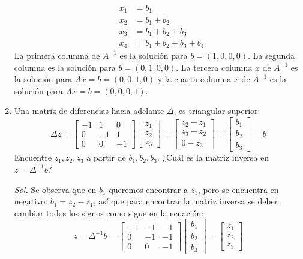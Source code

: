 \begin{enumerate}
	      \begin{align*}
		       & x_1& =b_1                   \\
		       & x_2& =b_{1}+b_2             \\
		       & x_3 & =b_{1}+b_2 +b_3        \\
		       & x_{4} & =b_{1}+b_2 +b_{3}+b_{4 }
	      \end{align*}
	      La primera columna de $A^{-1}$ es la solución para $b = (1,0,0,0)$. La segunda columna es la solución
	      para $b = (0,1,0,0)$. La tercera columna $x$ de $A^{-1}$ es la solución para $Ax = b = (0,0,1,0)$ y la cuarta columna $x$ de $A^{-1}$ es la solución para $Ax = b = (0,0,0,1)$.
	\item Una matriz de diferencias hacia adelante $\Delta$, es triangular superior:
	      \begin{equation*}
		      \Delta z= \begin{bmatrix} -1 & 1 &0 \\ 0 & -1 &1\\ 0 & 0 & -1 \end{bmatrix}\begin{bmatrix} z_{1}\\ z_2 \\ z_3 \end{bmatrix} = \begin{bmatrix} z_2 -z_{1}\\ z_{3}-z_2 \\ 0-z_3 \end{bmatrix} =\begin{bmatrix}
			      b_1\\b_2 \\b_{3}
		      \end{bmatrix}=b
	      \end{equation*}
	      Encuentre $z_{1}, z_2 , z_{3}$ a partir de $ b_{1},b_2 ,b_{3}$. ¿Cuál es la matriz inversa en $z= \Delta^{-1}b$?

	      \textit{ Sol. }
	      Se observa que en $b_{1}$ queremos encontrar a $z_{1}$, pero se encuentra en negativo: $b_{1}= z_2 -z_{1}$, así que para encontrar la matriz inversa se deben cambiar todos los signos como sigue en la ecuación:
	      \begin{equation}
		      z= \Delta^{-1}b= \begin{bmatrix} -1 & -1 &-1 \\ 0 & -1 &-1\\ 0 & 0 & -1 \end{bmatrix} \begin{bmatrix}
			      b_1\\b_2 \\b_{3}
		      \end{bmatrix} =\begin{bmatrix} z_{1}\\ z_2 \\ z_3 \end{bmatrix}
	      \end{equation}


\end{enumerate}
